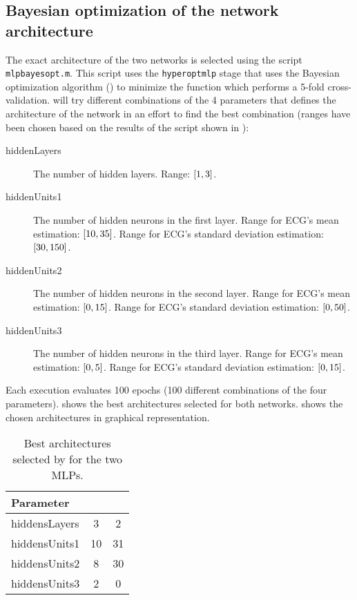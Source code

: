 

\subsection{Bayesian optimization of the network
architecture}\label{subsec:mlpbayesopt}

The exact architecture of the two networks is selected using the script
\texttt{mlpbayesopt.m}. This script uses the \texttt{hyperoptmlp} stage that
uses the Bayesian optimization algorithm () to minimize the
 function which performs a 5-fold cross-validation.
 will try different combinations of the 4 parameters that
defines the architecture of the network in an effort to find the best
combination (ranges have been chosen based on the results of the
 script shown in ):
\begin{description}
\item[hiddenLayers] The number of hidden layers. Range:
	\(\interval{1}{3}\).
\item[hiddenUnits1] The number of hidden neurons in the first layer. Range for
	ECG's mean estimation: \(\interval{10}{35}\). Range for ECG's standard
	deviation estimation: \(\interval{30}{150}\).
\item[hiddenUnits2] The number of hidden neurons in the second layer. Range for
	ECG's mean estimation: \(\interval{0}{15}\). Range for ECG's standard
	deviation estimation: \(\interval{0}{50}\).
\item[hiddenUnits3] The number of hidden neurons in the third layer. Range for
	ECG's mean estimation: \(\interval{0}{5}\). Range for ECG's standard
	deviation estimation: \(\interval{0}{15}\).
\end{description}

Each  execution evaluates 100 epochs (100 different combinations
of the four parameters).  shows the best
architectures selected for both networks.  shows the
chosen architectures in graphical representation.

\begin{table}[hbtp]
	\centering
	\begin{tabular}{|l|c|c|}
		\toprule
		Parameter & \standout{ECG mean} & \standout{ECG stddev} \\
		\midrule
		hiddensLayers & 3 & 2 \\
		hiddensUnits1 & 10 & 31 \\
		hiddensUnits2 & 8 & 30 \\
		hiddensUnits3 & 2 & 0 \\
		\bottomrule
	\end{tabular}
	\caption{Best architectures selected by  for the two
	MLPs.}\label{table:mlpbayesopt}
\end{table}

